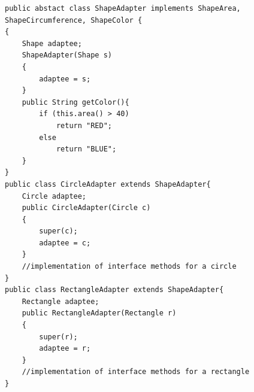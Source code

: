 \documentclass{acm_proc_article-sp}
\begin{document}
\begin{lstlisting}[float, label={lst:absshapesjava}, caption={The generated Java code from the adapter declarations in Listing~\ref{lst:absshapes}}]
public abstact class ShapeAdapter implements ShapeArea, ShapeCircumference, ShapeColor { 
{
	Shape adaptee;
	ShapeAdapter(Shape s)
	{
		adaptee = s;
	}
	public String getColor(){
		if (this.area() > 40)
			return "RED";
		else
			return "BLUE";
	}	
}
public class CircleAdapter extends ShapeAdapter{
	Circle adaptee;
	public CircleAdapter(Circle c)
	{
		super(c);
		adaptee = c;
	}
	//implementation of interface methods for a circle
}
public class RectangleAdapter extends ShapeAdapter{
	Rectangle adaptee;
	public RectangleAdapter(Rectangle r)
	{
		super(r);
		adaptee = r;
	}
	//implementation of interface methods for a rectangle
}
\end{lstlisting} 


%
%











\end{document}
